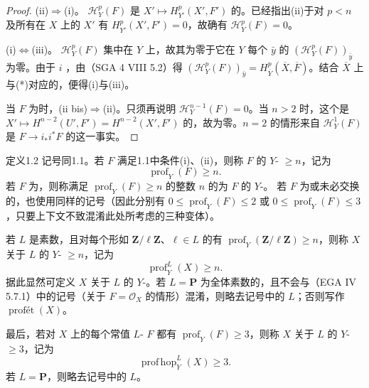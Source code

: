\begin{proof}
(ii)$\Rightarrow$(i)。 $\mathcal H_Y^p(F)$ 是 $X'\mapsto H^p_{Y'}(X',F')$ 的。已经指出(ii)于对 $p<n$ 及所有在 $X$ 上的 $X'$ 有 $H^p_{Y'}(X',F')=0$，故确有 $\mathcal H_Y^p(F)=0$。

(i)$\Leftrightarrow$(iii)。 $\mathcal H_Y^p(F)$ 集中在 $Y$ 上，故其为零于它在 $Y$ 每个 $\bar y$ 的 $(\mathcal H_Y^p(F))_{\bar y}$ 为零。由于 $i$ ，由（SGA 4 VIII 5.2）得 $(\mathcal H_Y^p(F))_{\bar y}=H^p_{\overline Y}(\overline X,\overline F)$。结合 $\overline X$ 上与(*)对应的，便得(i)与(iii)。

当 $F$ 为时，(ii bis)$\Rightarrow$(ii)。只须再说明 $\mathcal H_Y^{n-1}(F)=0$。当 $n>2$ 时，这个是 $X'\mapsto H^{n-2}(U',F')=H^{n-2}(X',F')$ 的，故为零。$n=2$ 的情形来自 $\mathcal H_Y^1(F)$ 是 $F\to i_*i^*F$ 的这一事实。
\end{proof}
\begin{SGAresult}{定义}{1.2}
记号同1.1。若 $F$ 满足1.1中条件(i)、(ii)，则称 $F$ 的 $Y$- $\geq n$，记为
\[\operatorname{prof}_Y(F)\geq n.\]
若 $F$ 为，则称满足 $\operatorname{prof}_Y(F)\geq n$ 的整数 $n$ 的为 $F$ 的 $Y$-。
若 $F$ 为或未必交换的，也使用同样的记号（因此分别有 $0\leq\operatorname{prof}_Y(F)\leq2$ 或 $0\leq\operatorname{prof}_Y(F)\leq3$，只要上下文不致混淆此处所考虑的三种变体）。

若 $L$ 是素数，且对每个形如 $\mathbf Z/\ell\mathbf Z$、$\ell\in L$ 的有 $\operatorname{prof}_Y(\mathbf Z/\ell\mathbf Z)\geq n$，则称 $X$ 关于 $L$ 的 $Y$- $\geq n$，记为
\[\operatorname{prof}_Y^L(X)\geq n.\]
据此显然可定义 $X$ 关于 $L$ 的 $Y$-。若 $L=\mathbf P$ 为全体素数的，且不会与（EGA IV 5.7.1）中的记号（关于 $F=\mathcal O_X$ 的情形）混淆，则略去记号中的 $L$；否则写作 $\operatorname{prof\text{ét}}(X)$。

最后，若对 $X$ 上的每个常值 $L$- $F$ 都有 $\operatorname{prof}_Y(F)\geq3$，则称 $X$ 关于 $L$ 的 $Y$- $\geq3$，记为
\[\operatorname{prof\,hop}_Y^L(X)\geq3.\]
若 $L=\mathbf P$，则略去记号中的 $L$。
\end{SGAresult}

